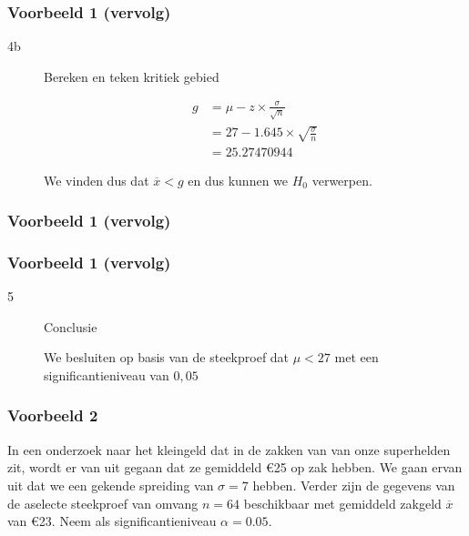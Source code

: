 \documentclass[aspectratio=169]{beamer}
\begin{document}
\begin{frame}
  \frametitle{Voorbeeld 1 (vervolg)}

  \begin{description}

    \item[4b] Bereken en teken kritiek gebied
    
    \begin{align*}
    g &= \mu - z \times \frac{\sigma}{\sqrt{n}} \\
      &= 27 - 1.645 \times \sqrt{\frac{\sigma}{n}} \\
      &= 25.27470944
    \end{align*}

    We vinden dus dat $\overline{x} < g$ en dus kunnen we $H_{0}$ verwerpen.
  \end{description}
\end{frame}

\begin{frame}
  \frametitle{Voorbeeld 1 (vervolg)}
  
  \bigskip
  \centering
\end{frame}

\begin{frame}
  \frametitle{Voorbeeld 1 (vervolg)}
  
  \begin{description}
  
    \item[5] Conclusie
    
    We besluiten op basis van de steekproef dat $\mu < 27$ met een significantieniveau van $0,05$
  \end{description}
\end{frame}


\begin{frame}
  \frametitle{Voorbeeld 2}
  In een onderzoek naar het kleingeld dat in de zakken van  van  onze superhelden zit, wordt er van uit gegaan dat ze gemiddeld \euro{25} op zak hebben. We gaan ervan uit dat we een gekende spreiding van $\sigma = 7$ hebben. Verder zijn de gegevens van de aselecte steekproef van omvang $n=64$ beschikbaar met gemiddeld zakgeld $\overline{x}$ van \euro{23}. Neem als significantieniveau $\alpha = 0.05$.
\end{frame}
\end{document}
